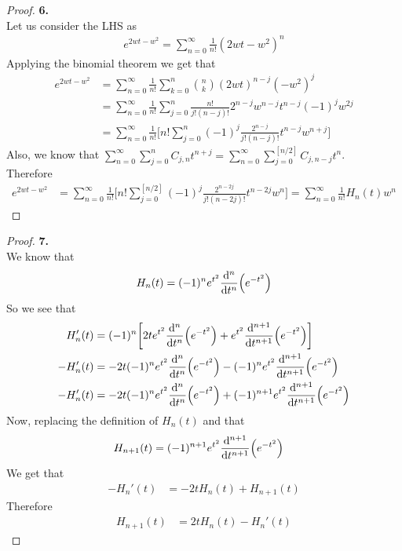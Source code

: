\documentclass[11pt]{article}
\theoremstyle{definition}
\begin{document}
\cleardoublepage
\begin{proof}{\textbf{6.}}\\
Let us consider the LHS as
\begin{align*}
    e^{2wt - w^2} = \sum_{n=0}^\infty \frac{1}{n!}(2wt - w^2)^n
\end{align*}
Applying the binomial theorem we get that
\begin{align*}
    e^{2wt - w^2}
    &= \sum_{n=0}^\infty \frac{1}{n!} 
    \sum_{k=0}^n\binom{n}{k}(2wt)^{n-j} (-w^2)^{j}\\
    &= \sum_{n=0}^\infty \frac{1}{n!} 
    \sum_{j=0}^n\frac{n!}{j!(n-j)!}2^{n-j}w^{n-j}t^{n-j}(-1)^jw^{2j}\\
    &= \sum_{n=0}^\infty \frac{1}{n!}\bigg[
    n!\sum_{j=0}^n(-1)^j\frac{2^{n-j}}{j!(n-j)!}t^{n-j}w^{n + j}\bigg]
\end{align*}
Also, we know that $\sum_{n=0}^\infty \sum_{j=0}^n C_{j,n}t^{n+j}
= \sum_{n=0}^\infty \sum_{j=0}^{[n/2]} C_{j, n-j}t^{n}$.\\
Therefore
\begin{align*}
    e^{2wt - w^2}
    &= \sum_{n=0}^\infty \frac{1}{n!}\bigg[
    n!\sum_{j=0}^{[n/2]} (-1)^j\frac{2^{n-2j}}{j!(n-2j)!}t^{n-2j}w^{n}\bigg]
    = \sum_{n=0}^\infty \frac{1}{n!} H_n(t) w^{n}
\end{align*}
\end{proof}

\cleardoublepage
\begin{proof}{\textbf{7.}}\\
We know that
\begin{align*}
    H_n(t) = (-1)^{n}e^{t^2}\dv[n]{t}(e^{-t^2})
\end{align*}
So we see that
\begin{align*}
    H_n'(t) &= (-1)^n \bigg[
        2te^{t^2}\dv[n]{t}(e^{-t^2})
        + e^{t^2}\dv[n+1]{t}(e^{-t^2})
    \bigg]\\
    -H_n'(t) &= -2t(-1)^ne^{t^2}\dv[n]{t}(e^{-t^2})
    - (-1)^ne^{t^2}\dv[n+1]{t}(e^{-t^2})\\
    -H_n'(t) &= -2t(-1)^ne^{t^2}\dv[n]{t}(e^{-t^2})
    + (-1)^{n + 1}e^{t^2}\dv[n+1]{t}(e^{-t^2})
\end{align*}
Now, replacing the definition of $H_n(t)$ and that 
\begin{align*}
    H_{n+1}(t) &= (-1)^{n+1}e^{t^2}\dv[n+1]{t}(e^{-t^2})
\end{align*}
We get that
\begin{align*}
    -H_n'(t) &= -2tH_n(t) + H_{n+1}(t)
\end{align*}
Therefore
\begin{align*}
    H_{n+1}(t) &= 2tH_n(t) - H_{n}'(t)
\end{align*}
\end{proof}
\end{document}
